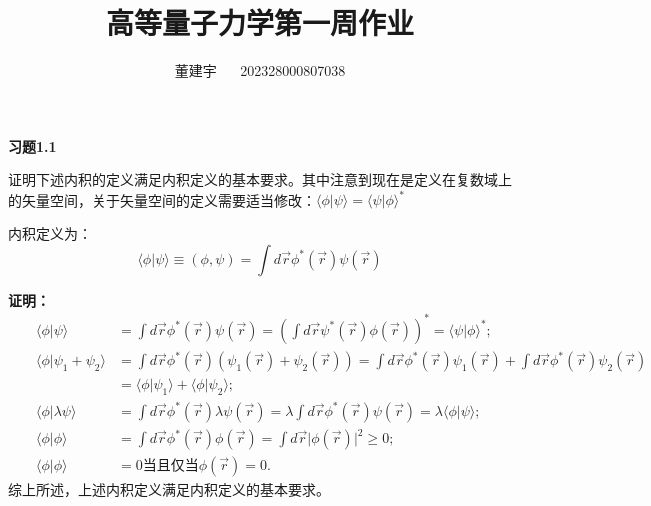 \documentclass[reqno,a4paper,12pt]{amsart}
\title{高等量子力学第一周作业}
\author{董建宇 ~~ 202328000807038}
\begin{document}
\maketitle
\titleformat{\section}[hang]{\small}{\thesection}{0.8em}{}{}
\titleformat{\subsection}[hang]{\small}{\thesubsection}{0.8em}{}{}

\textbf{习题1.1} 

证明下述内积的定义满足内积定义的基本要求。其中注意到现在是定义在复数域上的矢量空间，关于矢量空间的定义需要适当修改：$\langle \phi \vert \psi \rangle = \langle \psi \vert \phi \rangle^*$

内积定义为：
\[
	\langle \phi \vert \psi \rangle \equiv (\phi, \psi) = \int d\vec{r} \phi^*(\vec{r}) \psi(\vec{r}) 
\]

\begin{tcolorbox}[breakable, colback = black!5!white, colframe = black]

\textbf{证明：}
\begin{align*}
	& &\langle \phi \vert \psi \rangle &= \int d\vec{r} \phi^*(\vec{r}) \psi(\vec{r}) = \left( \int d\vec{r} \psi^*(\vec{r})\phi(\vec{r}) \right)^* = \langle \psi \vert \phi \rangle^*; \\
	& &\langle \phi \vert \psi_1 + \psi_2 \rangle &= \int d\vec{r} \phi^*(\vec{r}) (\psi_1(\vec{r}) + \psi_2(\vec{r})) = \int d\vec{r} \phi^*(\vec{r}) \psi_1(\vec{r}) + \int d\vec{r} \phi^*(\vec{r}) \psi_2(\vec{r}) \\
	& & &= \langle \phi \vert \psi_1 \rangle + \langle \phi \vert \psi_2 \rangle; \\
	& &\langle \phi \vert \lambda \psi \rangle &= \int d\vec{r} \phi^*(\vec{r}) \lambda \psi(\vec{r}) = \lambda \int d\vec{r} \phi^*(\vec{r}) \psi(\vec{r}) = \lambda \langle \phi \vert \psi \rangle; \\
	& &\langle \phi \vert \phi \rangle &= \int d\vec{r} \phi^*(\vec{r}) \phi(\vec{r}) = \int d\vec{r} \vert \phi(\vec{r}) \vert^2 \geq 0; \\
	& &\langle \phi \vert \phi \rangle &= 0 \text{当且仅当} \phi(\vec{r}) = 0.
\end{align*}
综上所述，上述内积定义满足内积定义的基本要求。
\end{tcolorbox}
\end{document}
